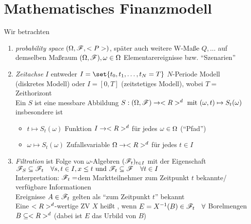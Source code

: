 \section{Mathematisches Finanzmodell}
Wir betrachten
\begin{enumerate}
	\item \emph{probability space} $(\Omega,\mathscr F,<P>)$, später auch weitere W-Maße $Q, \dots$ auf demselben Maßraum $(\Omega,\mathscr F), \omega \in \Omega$ Elementarereignisse bzw. ``Szenarien''
	\item \emph{Zeitachse} $I$ entweder $I=\set{t_0, t_1, \dots, t_N=T}$ $N$-Periode Modell (diskretes Modell) oder $I = [0,T]$ (zeitstetiges Modell), wobei $T = $ Zeithorizont\\
	Ein  $S$ ist eine messbare Abbildung $S: (\Omega,\mathscr F) \to <R>^d \text{ mit } (\omega, t) \mapsto S_t(\omega)$\\
	insbesondere ist 
	\begin{itemize}
		\item $t \mapsto S_t(\omega)$ Funktion $I \to <R>^d$ für jedes $\omega \in \Omega$ (``Pfad'')
		\item $\omega \mapsto S_t(\omega)$ Zufallsvariable $\Omega \to <R>^d$ für jedes $t \in I$
	\end{itemize}
	\item \emph{Filtration} ist Folge von $\omega$-Algebren $(\mathscr F_t)_{t \in I}$ mit der Eigenschaft $\mathscr F_S \subseteq \mathscr F_t \quad \forall s,t \in I, x \le t \text{ und } \mathscr F_t \subseteq \mathscr F\quad \forall t \in I$\\
	Interpretation: $\mathscr F_t=$dem Marktteilnehmer zum Zeitpunkt $t$ bekannte/ verfügbare Informationen\\
	Ereignisse $A \in \mathscr F_t$ gelten als ``zum Zeitpunkt $t$'' bekannt\\
	Eine $<R>^d$-wertige ZV $X$ heißt , wenn $E = X^{-1}(B) \in \mathscr F_t \quad \forall$ Borelmengen $B \subseteq <R>^d$ (dabei ist $E$ das Urbild von $B$)


\end{enumerate}

